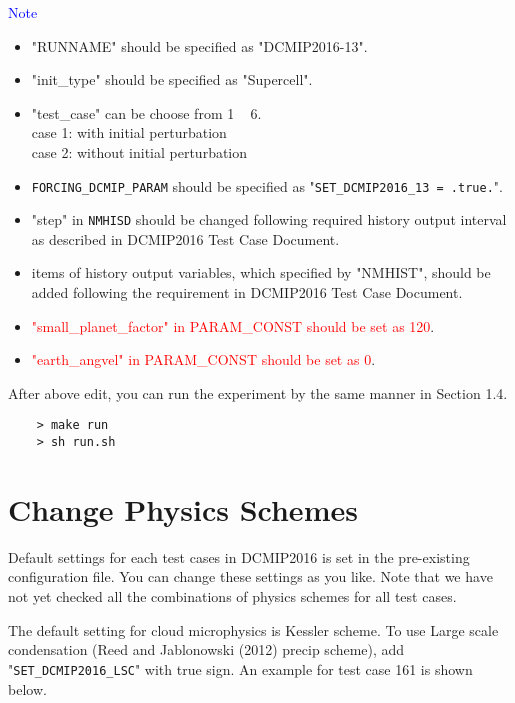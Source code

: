  \noindent \textcolor{blue}{{\sf Note}}
 \begin{itemize}
   \item "RUNNAME" should be specified as "DCMIP2016-13".
   \item "init\_type" should be specified as "Supercell".
   \item "test\_case" can be choose from 1 ~ 6.\\
          case 1: with initial perturbation \\
          case 2: without initial perturbation
   \item \verb|FORCING_DCMIP_PARAM| should be specified as "\verb|SET_DCMIP2016_13 = .true.|".
   \item "step" in \verb|NMHISD| should be changed following required history output interval
           as described in DCMIP2016 Test Case Document.
   \item items of history output variables, which specified by "NMHIST", should be added
         following the requirement in DCMIP2016 Test Case Document.
   \item \textcolor{red}{"small\_planet\_factor" in PARAM\_CONST should be set as 120}.
   \item \textcolor{red}{"earth\_angvel" in PARAM\_CONST should be set as 0}.
 \end{itemize}

 \noindent After above edit, you can run the experiment
 by the same manner in Section 1.4.
 \begin{verbatim}
    > make run
    > sh run.sh
 \end{verbatim}


\section{Change Physics Schemes}

 \noindent Default settings for each test cases in DCMIP2016 is set
 in the pre-existing configuration file. You can change these settings
 as you like. Note that we have not yet checked all the combinations of
 physics schemes for all test cases. \\



 \noindent The default setting for cloud microphysics is Kessler scheme.
 To use Large scale condensation (Reed and Jablonowski (2012) precip scheme),
 add "\verb|SET_DCMIP2016_LSC|" with true sign. An example for test case 161
 is shown below.

